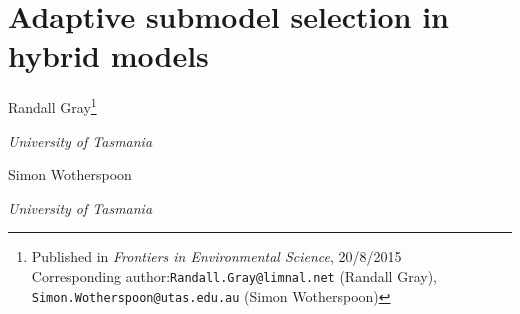 


\chapter{Adaptive submodel selection in hybrid  models}
  

\begin{center}
  Randall Gray\footnote{{Published in \emph{Frontiers in Environmental Science}, 20/8/2015}\\
    Corresponding author:\texttt{Randall.Gray@limnal.net} (Randall Gray),\\
      \texttt{Simon.Wotherspoon@utas.edu.au} (Simon Wotherspoon)
      }

    \emph{University of Tasmania}

    Simon Wotherspoon 

    \emph{University of Tasmania}
\end{center}

